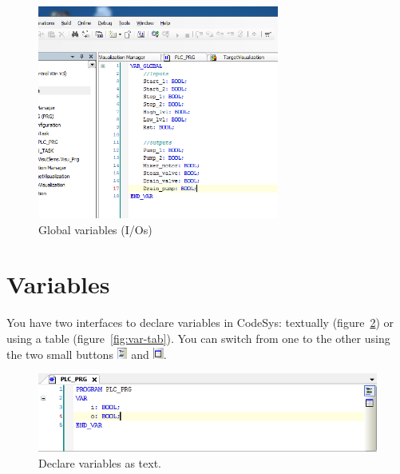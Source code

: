 \documentclass[10pt,a4paper]{article}
\begin{document}
\begin{figure}[h!]
	\begin{center}
		\includegraphics[width=300px]{img6.PNG}
	\end{center}
\caption{Global variables (I/Os)}
\label{fig:glob_var}
\end{figure}



\section{Variables}
You have two interfaces to declare variables in CodeSys: textually (figure~\ref{fig:var-text}) or using a table (figure~\ref{fig:var-tab}).
You can switch from one to the other using the two small buttons \includegraphics[height=1em]{var-text-button} and \includegraphics[height=1em]{var-tab-button}.

\begin{figure}[h!]
	\center
	\includegraphics[width=.8\textwidth]{var-text}
	\caption{Declare variables as text.}
	\label{fig:var-text}
\end{figure}
\end{document}

